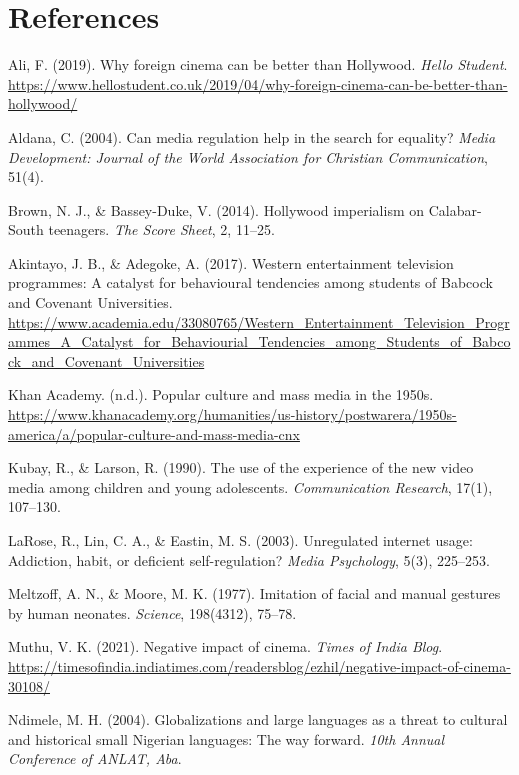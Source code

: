 \documentclass[12pt]{article}
\begin{document}
\section{References}

\begin{thebibliography}{13}
Ali, F. (2019). Why foreign cinema can be better than Hollywood. \textit{Hello Student}. \url{https://www.hellostudent.co.uk/2019/04/why-foreign-cinema-can-be-better-than-hollywood/}

Aldana, C. (2004). Can media regulation help in the search for equality? \textit{Media Development: Journal of the World Association for Christian Communication}, 51(4).

Brown, N. J., \& Bassey-Duke, V. (2014). Hollywood imperialism on Calabar-South teenagers. \textit{The Score Sheet}, 2, 11--25.

Akintayo, J. B., \& Adegoke, A. (2017). Western entertainment television programmes: A catalyst for behavioural tendencies among students of Babcock and Covenant Universities. \url{https://www.academia.edu/33080765/Western_Entertainment_Television_Programmes_A_Catalyst_for_Behaviourial_Tendencies_among_Students_of_Babcock_and_Covenant_Universities}

Khan Academy. (n.d.). Popular culture and mass media in the 1950s. \url{https://www.khanacademy.org/humanities/us-history/postwarera/1950s-america/a/popular-culture-and-mass-media-cnx}

Kubay, R., \& Larson, R. (1990). The use of the experience of the new video media among children and young adolescents. \textit{Communication Research}, 17(1), 107--130.

LaRose, R., Lin, C. A., \& Eastin, M. S. (2003). Unregulated internet usage: Addiction, habit, or deficient self-regulation? \textit{Media Psychology}, 5(3), 225--253.

Meltzoff, A. N., \& Moore, M. K. (1977). Imitation of facial and manual gestures by human neonates. \textit{Science}, 198(4312), 75--78.

Muthu, V. K. (2021). Negative impact of cinema. \textit{Times of India Blog}. \url{https://timesofindia.indiatimes.com/readersblog/ezhil/negative-impact-of-cinema-30108/}

Ndimele, M. H. (2004). Globalizations and large languages as a threat to cultural and historical small Nigerian languages: The way forward. \textit{10th Annual Conference of ANLAT, Aba}.


\end{thebibliography}
\end{document}
